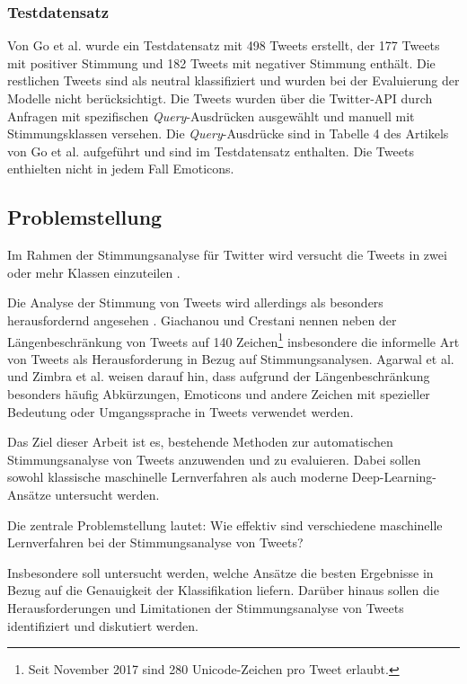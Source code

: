 \subsubsection{Testdatensatz}\label{subsec:testdata}

Von Go et al. \cite{go2009twitter} wurde ein Testdatensatz mit 498 Tweets erstellt, der 177 Tweets mit positiver Stimmung und 182 Tweets mit negativer Stimmung enthält.
Die restlichen Tweets sind als neutral klassifiziert und wurden bei der Evaluierung der Modelle nicht berücksichtigt.
Die Tweets wurden über die Twitter-API durch Anfragen mit spezifischen \textit{Query}-Ausdrücken ausgewählt und manuell mit Stimmungsklassen versehen.
Die \textit{Query}-Ausdrücke sind in Tabelle 4 des Artikels von Go et al. \cite[S. 5]{go2009twitter} aufgeführt und sind im Testdatensatz enthalten.
Die Tweets enthielten nicht in jedem Fall Emoticons.

\subsection{Problemstellung}

Im Rahmen der Stimmungsanalyse für Twitter wird versucht die Tweets in zwei oder mehr Klassen einzuteilen \cite{zimbra2018state}.

Die Analyse der Stimmung von Tweets wird allerdings als besonders herausfordernd angesehen \cite{agarwal2011sentiment, giachanou2016like, zimbra2018state}.
Giachanou und Crestani \cite{giachanou2016like} nennen neben der Längenbeschränkung von Tweets auf 140 Zeichen\footnote{
    Seit November 2017 sind 280 Unicode-Zeichen pro Tweet erlaubt.
} insbesondere die informelle Art von Tweets als Herausforderung in Bezug auf Stimmungsanalysen.
Agarwal et al. \cite{agarwal2011sentiment} und Zimbra et al. \cite{zimbra2018state} weisen darauf hin, dass aufgrund der Längenbeschränkung besonders häufig Abkürzungen, Emoticons und andere Zeichen mit spezieller Bedeutung oder Umgangssprache in Tweets verwendet werden.

Das Ziel dieser Arbeit ist es, bestehende Methoden zur automatischen Stimmungsanalyse von Tweets anzuwenden und zu evaluieren.
Dabei sollen sowohl klassische maschinelle Lernverfahren als auch moderne Deep-Learning-Ansätze untersucht werden.

Die zentrale Problemstellung lautet: Wie effektiv sind verschiedene maschinelle Lernverfahren bei der Stimmungsanalyse von Tweets?

Insbesondere soll untersucht werden, welche Ansätze die besten Ergebnisse in Bezug auf die Genauigkeit der Klassifikation liefern.
Darüber hinaus sollen die Herausforderungen und Limitationen der Stimmungsanalyse von Tweets identifiziert und diskutiert werden.
